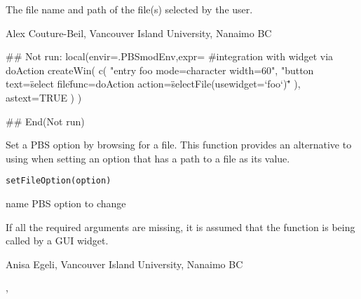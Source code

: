 \documentclass[letterpaper]{book}
\begin{document}
%
\begin{Value}
The file name and path of the file(s) selected by the user.
\end{Value}
%
\begin{Author}\relax
Alex Couture-Beil, Vancouver Island University, Nanaimo BC
\end{Author}
%
\begin{SeeAlso}\relax
{}
\end{SeeAlso}
%
\begin{Examples}
\begin{ExampleCode}
## Not run: 
local(envir=.PBSmodEnv,expr={
  #integration with widget via doAction
  createWin( c( "entry foo mode=character width=60", 
    "button text=\"select file\" 
    func=doAction action=\"selectFile(usewidget=`foo`)\"" ), astext=TRUE )
})

## End(Not run)
\end{ExampleCode}
\end{Examples}
%
\begin{Description}\relax
Set a PBS option by browsing for a file. This function provides 
an alternative to using  when setting an 
option that has a path to a file as its value.
\end{Description}
%
\begin{Usage}
\begin{verbatim}
setFileOption(option)
\end{verbatim}
\end{Usage}
%
\begin{Arguments}
\begin{ldescription}
\item[\code{option}] name PBS option to change
\end{ldescription}
\end{Arguments}
%
\begin{Note}\relax
If all the required arguments are missing, it is assumed that 
the function is being called by a GUI widget.
\end{Note}
%
\begin{Author}\relax
Anisa Egeli, Vancouver Island University, Nanaimo BC
\end{Author}
%
\begin{SeeAlso}\relax
{}, 
\end{SeeAlso}
%
\end{document}
